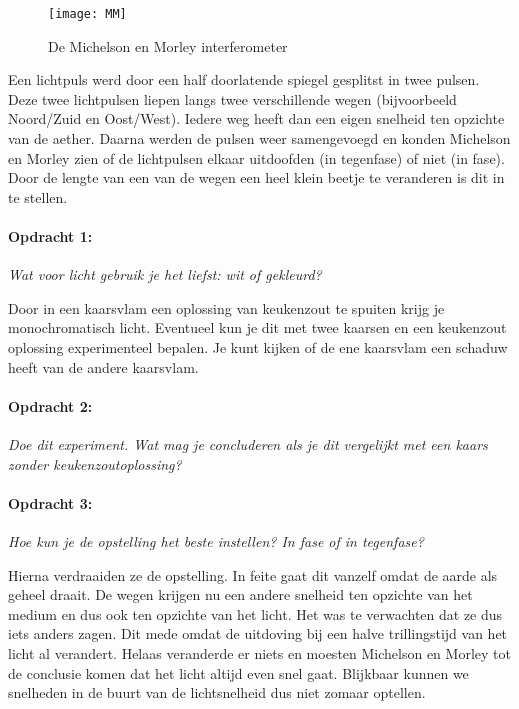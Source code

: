 \begin{figure}[H]
\centering
\texttt{[image: MM]}

\caption{De Michelson en Morley interferometer}
\end{figure}


Een lichtpuls werd door een half doorlatende spiegel gesplitst in
twee pulsen. Deze twee lichtpulsen liepen langs twee verschillende
wegen (bijvoorbeeld Noord/Zuid en Oost/West). Iedere weg heeft dan
een eigen snelheid ten opzichte van de aether. Daarna werden de pulsen
weer samengevoegd en konden Michelson en Morley zien of de lichtpulsen
elkaar uitdoofden (in tegenfase) of niet (in fase). Door de lengte
van een van de wegen een heel klein beetje te veranderen is dit in
te stellen.

\paragraph*{Opdracht 1:} \emph{Wat voor licht gebruik je het liefst: wit of gekleurd? }

Door in een kaarsvlam een oplossing van keukenzout te spuiten krijg
je monochromatisch licht. Eventueel kun je dit met twee kaarsen en
een keukenzout oplossing experimenteel bepalen. Je kunt kijken of
de ene kaarsvlam een schaduw heeft van de andere kaarsvlam.

\paragraph*{Opdracht 2:} \emph{Doe dit experiment. Wat mag je concluderen als je
dit vergelijkt met een kaars zonder keukenzoutoplossing? }

\paragraph*{Opdracht 3:} \emph{Hoe kun je de opstelling het beste instellen? In
fase of in tegenfase?}

Hierna verdraaiden ze de opstelling. In feite gaat dit vanzelf omdat
de aarde als geheel draait. De wegen krijgen nu een andere snelheid
ten opzichte van het medium en dus ook ten opzichte van het licht.
Het was te verwachten dat ze dus iets anders zagen. Dit mede omdat
de uitdoving bij een halve trillingstijd van het licht al ver\-andert.
Helaas veranderde er niets en moesten Michelson en Morley tot de conclusie
komen dat het licht altijd even snel gaat. Blijkbaar kunnen we snelheden
in de buurt van de lichtsnelheid dus niet zomaar optellen.

